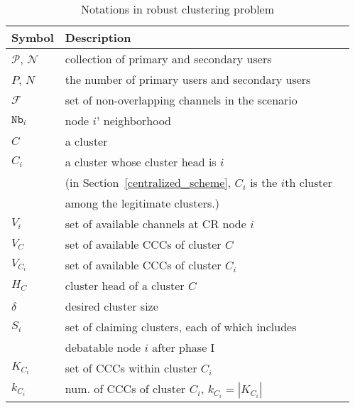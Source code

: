 \documentclass[10pt,journal,compsoc]{IEEEtran}
\theoremstyle{mytheoremstyle}
\theoremstyle{mytheoremstyle}
\theoremstyle{mytheoremstyle}
\begin{document}
\begin{table}[h!]
\caption{Notations in robust clustering problem}
\label{tab1}
\centering
\begin{tabular}{llr}
\toprule
Symbol & Description \\
\midrule
$\mathcal{P}$, $\mathcal{N}$  & collection of primary and secondary users\\
$P$, $N$ & the number of primary users and secondary users\\
$\mathcal{F}$ & set of non-overlapping channels in the scenario\\
$\texttt{Nb}_i$ & node $i$' neighborhood     \\
$C$ & a cluster \\
$C_i$ & a cluster whose cluster head is $i$ \\
& (in Section~\ref{centralized_scheme}, $C_i$ is the $i$th cluster \\
& among the legitimate clusters.)\\
$V_i$   & set of available channels at CR node $i$  \\
$V_C$   & set of available CCCs of cluster $C$  \\
$V_{C_i}$   & set of available CCCs of cluster $C_i$\\
$H_C$ & cluster head of a cluster $C$\\
$\delta$ & desired cluster size\\
$S_i$ & set of claiming clusters, each of which includes \\
& debatable node $i$ after phase I\\
$K_{C_i}$ & set of CCCs within cluster $C_i$\\
$k_{C_i}$ & num. of CCCs of cluster $C_i$, $k_{C_i} = |K_{C_i}|$\\
\bottomrule
\end{tabular}
\end{table}
\end{document}
